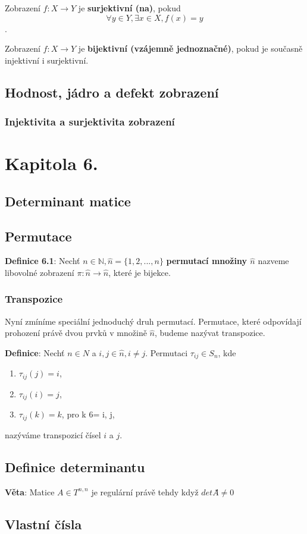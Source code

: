 \documentclass[12pt, letterpaper, twoside]{article}
\begin{document}
Zobrazení $f: X \to Y$ je \textbf{surjektivní (na)}, pokud
\[\forall y \in Y, \exists x \in X, f(x) = y\].

Zobrazení $f: X \to Y$ je \textbf{bijektivní (vzájemně jednoznačné)}, pokud
je současně injektivní i surjektivní.


\subsection{Hodnost, jádro a defekt zobrazení}
\subsubsection{Injektivita a surjektivita zobrazení}



\section{Kapitola 6.}
\subsection*{Determinant matice}

\subsection{Permutace}

\textbf{Definice 6.1}: Nechť $n \in \mathbb{N}, \hat{n} = \{1,2,...,n\}$ \textbf{permutací množiny $\hat{n}$}
 nazveme libovolné zobrazení $\pi: \hat{n} \to \hat{n}$, které je bijekce.

\subsubsection{Transpozice}

Nyní zmíníme speciální jednoduchý druh permutací.
Permutace, které odpovídají prohození právě dvou prvků v množině $\hat{n}$, budeme nazývat transpozice.

\textbf{Definice}: Nechť $n \in N$ a $i, j \in \hat{n}, i \neq j$. Permutaci $\tau_{ij} \in S_{n}$, kde

\begin{enumerate}
    \item $\tau_{ij} (j) = i$,
    \item $\tau_{ij} (i) = j$,
    \item $\tau_{ij} (k) = k$, pro k 6= i, j,
\end{enumerate}

nazýváme transpozicí čísel $i$ a $j$.

\subsection{Definice determinantu}

\textbf{Věta}: Matice $A \in T^{n,n}$ je regulární právě tehdy když $detA ̈́\neq 0$


\subsection*{Vlastní čísla}
\end{document}
